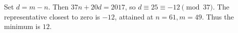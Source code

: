 Set $ d=m-n $. Then $ 37n+20d=2017 $, so $ d\equiv25\equiv-12\pmod{37}$. The representative closest to zero is $-12 $, attained at $ n=61,m=49 $. Thus the minimum is $\boxed{12}$.
